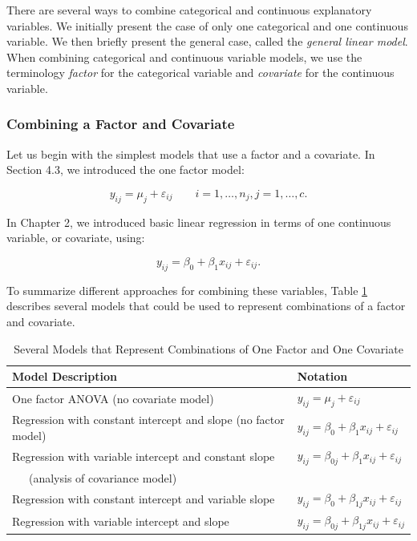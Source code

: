 There are several ways to combine categorical and continuous
explanatory variables. We initially present the case of only one
categorical and one continuous variable. We then briefly present the
general case, called the \textit{general linear model}. When
combining categorical and continuous variable models, we use the
terminology \emph{factor} for the categorical variable and
\emph{covariate} for the continuous variable.

\subsubsection*{Combining a Factor and Covariate}

Let us begin with the simplest models that use a factor and a
covariate. In Section 4.3, we introduced the one factor model:

\begin{equation*}
y_{ij}=\mu_{j} + \varepsilon_{ij}\qquad i=1,\ldots ,n_{j},\text{
}j=1,\ldots ,c.
\end{equation*}

In Chapter 2, we introduced basic linear regression in terms of one
continuous variable, or covariate, using:

\begin{equation*}
y_{ij}=\beta_0+\beta_1x_{ij} + \varepsilon_{ij}.
\end{equation*}

\noindent To summarize different approaches for combining these
variables, Table \ref{T4:OneFactorCovariate} describes several
models that could be used to represent combinations of a factor and
covariate.

 \begin{center}  \begin{table}[h]
\caption{\label{T4:OneFactorCovariate}  Several Models that
Represent Combinations of One Factor and One Covariate}
\begin{tabular}{ll}
\hline Model Description & Notation \\ \hline One factor ANOVA (no
covariate model) &
$y_{ij}=\mu_{j}+\varepsilon_{ij}$ \\
Regression with constant intercept and slope (no factor
model) & $y_{ij}=\beta_0+\beta_1x_{ij}+\varepsilon_{ij}$ \\
Regression with variable intercept and constant slope &
$y_{ij}=\beta_{0j}+\beta_1x_{ij}+\varepsilon_{ij}$ \\
~~~(analysis of covariance model) &  \\
Regression with constant intercept and variable slope &
$y_{ij}=\beta_0+\beta_{1j}x_{ij}+\varepsilon_{ij}$ \\
Regression with variable intercept and slope &
$y_{ij}=\beta_{0j}+\beta_{1j}x_{ij}+\varepsilon_{ij}$ \\
\hline
\end{tabular}
\end{table}  \end{center}  

